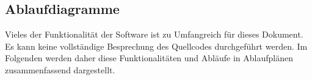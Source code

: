 \subsection{Ablaufdiagramme}
%
Vieles der Funktionalität der Software ist zu Umfangreich für dieses Dokument. Es kann keine vollständige Besprechung des Quellcodes durchgeführt werden. Im Folgenden werden daher diese Funktionalitäten und Abläufe in Ablaufplänen zusammenfassend dargestellt.
%

%

%

%

